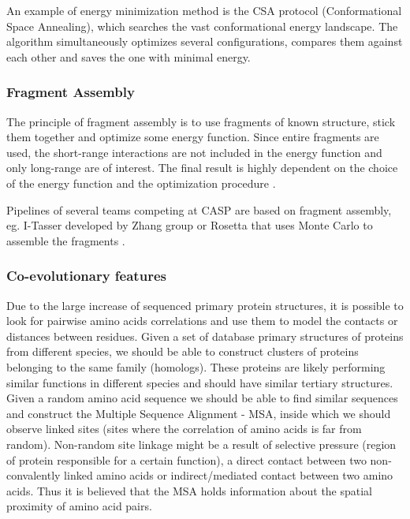 An example of energy minimization method is the CSA protocol \cite{csa} (Conformational Space Annealing), which searches the vast conformational energy landscape. The algorithm simultaneously optimizes several configurations, compares them against each other and saves the one with minimal energy.

\subsubsection{Fragment Assembly}

The principle of fragment assembly is to use fragments of known structure, stick them together and optimize some energy function. Since entire fragments are used, the short-range interactions are not included in the energy function and only long-range are of interest. The final result is highly dependent on the choice of the energy function and the optimization procedure \cite{fragments}.

Pipelines of several teams competing at CASP are based on fragment assembly, eg. I-Tasser developed by Zhang group \cite{zhang} or Rosetta that uses Monte Carlo to assemble the fragments \cite{rosetta}.

\subsubsection{Co-evolutionary features}


Due to the large increase of sequenced primary protein structures, it is possible to look for pairwise amino acids correlations and use them to model the contacts or distances between residues.
Given a set of database primary structures of proteins from different species, we should be able to construct clusters of proteins belonging to the same family (homologs). 
These proteins are likely performing similar functions in different species and should have similar tertiary structures. 
Given a random amino acid sequence we should be able to find similar sequences and construct the Multiple Sequence Alignment - MSA, inside which we should observe linked sites (sites where the correlation of amino acids is far from random). 
Non-random site linkage might be a result of selective pressure (region of protein responsible for a certain function), a direct contact between two non-convalently linked amino acids or indirect/mediated contact between two amino acids. 
Thus it is believed that the MSA holds information about the spatial proximity of amino acid pairs.

